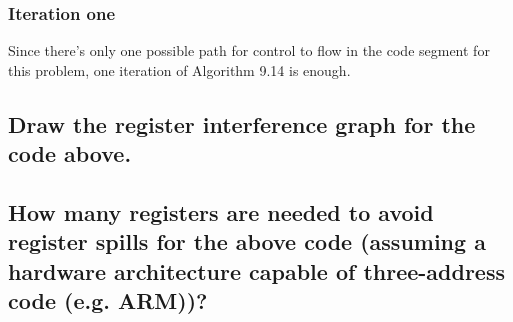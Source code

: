 \subsubsection{Iteration one}
\newcommand{\INBe}			{b, c}
\newcommand{\OUTBe}			{b, c}
\renewcommand{\INBone}		{b, c}
\renewcommand{\OUTBone}		{a, b}
\renewcommand{\INBtwo}		{a, b}
\renewcommand{\OUTBtwo}		{a, d}
\renewcommand{\INBthree}	{a, d}
\renewcommand{\OUTBthree}	{a, d}
\renewcommand{\INBfour}		{a, d}
\renewcommand{\OUTBfour}	{a, d, e}
\renewcommand{\INBfive}		{a, d, e}
\renewcommand{\OUTBfive}	{e}
\newcommand{\INBsix}		{e}
\newcommand{\OUTBsix}		{$\emptyset$}


Since there's only one possible path for control to flow in the code segment for this problem, one iteration of Algorithm 9.14 is enough.
\subsection{Draw the register interference graph for the code above.}

\subsection{How many registers are needed to avoid register spills for the above code (assuming a hardware architecture capable of three-address code (e.g. ARM))?}
